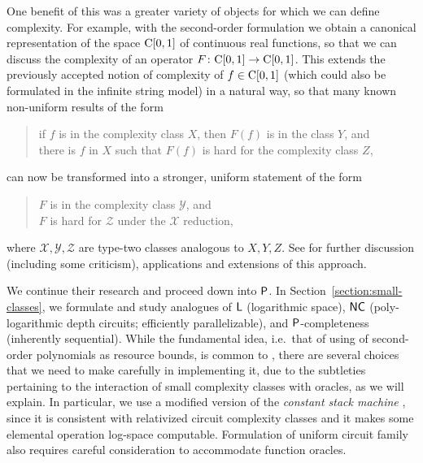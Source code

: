 \documentclass[a4paper,UKenglish]{lipics}
\begin{document}
One benefit of this was
a greater variety of objects for which we can define complexity. 
For example, with the second-order formulation
we obtain a canonical representation of the space $\mathrm C [0, 1]$
of continuous real functions, 
so that we can discuss the complexity of an
operator $F \colon \mathrm C [0, 1] \to \mathrm C [0, 1]$. 
This extends the previously accepted notion of 
complexity of $f \in \mathrm C [0, 1]$
(which could also be formulated in the infinite string model)
in a natural way, so that many known non-uniform results of the form
\begin{quote}
 if $f$ is in the complexity class $X$,
 then $F(f)$ is in the class $Y$, and \\
 there is $f$ in $X$ such that $F(f)$ is hard for
 the complexity class $Z$, 
\end{quote}
can now be transformed into a stronger, uniform statement of the form
\begin{quote}
 $F$ is in the complexity class $\mathcal Y$, and \\
 $F$ is hard for $\mathcal Z$ under the $\mathcal X$ reduction,
\end{quote}
where $\mathcal{X, Y, Z}$ are type-two classes analogous to ${X, Y, Z}$.
See \cite{feree,rettinger,roesnick} for further discussion (including some criticism), 
applications and extensions of this approach. 

We continue their research and proceed down into $\mathsf{P}$. 
In Section~\ref{section:small-classes}, 
we formulate and study analogues of 
$\mathsf{L}$ (logarithmic space), 
$\mathsf{NC}$ (poly-logarithmic depth circuits; efficiently parallelizable), 
and 
$\mathsf{P}$-completeness (inherently sequential). 
While the fundamental idea, 
i.e.\ that of using of second-order polynomials as resource bounds, 
is common to \cite{kawamura2012complexity}, 
there are several choices that we need to make carefully
in implementing it, 
due to the subtleties pertaining to 
the interaction of small complexity classes with oracles, 
as we will explain. 
In particular, 
we use a modified version of 
the \emph{constant stack machine} \cite{aehlig2007relativizing}, 
since it is consistent with relativized circuit complexity classes 
and it makes some elemental operation log-space computable.
Formulation of uniform circuit family
also requires careful consideration to 
accommodate function oracles. 
\end{document}
